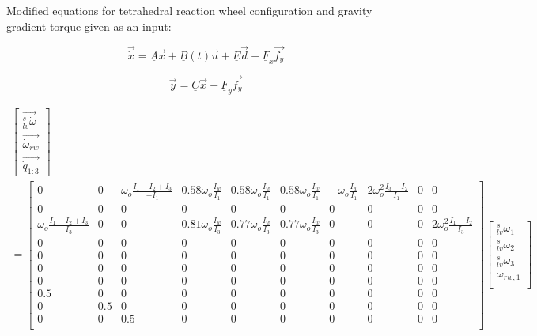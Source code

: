 \normalsize

Modified equations for tetrahedral reaction wheel configuration and gravity gradient torque given as an input:

\begin{equation}
\vec{\dot{x}} =
\underline{A}\vec{x} + \underline{B}(t)\vec{u} + \underline{E} \vec{d} + \underline{F}_x \vec{f_y} 
\label{eq:uioagain}
\end{equation}

\begin{equation}
\vec{y} =
\underline{C}\vec{x} + \underline{F}_y \vec{f_y} 
\label{eq:uioagain2}
\end{equation}

\tiny
\begin{align}
\begin{bmatrix}
\vec{_{lv}^s\dot{\omega}} \\
\vec{\dot{\omega}_{rw} } \\
\vec{\dot{q}_{1:3}}
\end{bmatrix} 
\nonumber\\
= \begin{bmatrix}
0 & 0 & \omega_o\frac{I_1 - I_2 + I_3}{-I_1} & 0.58\omega_o\frac{I_w}{I_1} & 0.58\omega_o\frac{I_w}{I_1} & 0.58\omega_o\frac{I_w}{I_1} & -\omega_o\frac{I_w}{I_1} & 2\omega_o^2\frac{I_3 - I_2}{I_1} & 0 & 0 \\
0 & 0 &	0 & 0 & 0 &	0 & 0 &  0 &  0 & 0\\
\omega_o\frac{I_1 - I_2 + I_3}{I_3}  & 0 & 0 &  0.81\omega_o\frac{I_w}{I_3} & 0.77\omega_o\frac{I_w}{I_3} & 0.77\omega_o\frac{I_w}{I_3} &	0 & 0 & 0 & 2\omega_o^2\frac{I_1 - I_2}{I_3}\\
0 & 0 &	0  & 0 & 0 & 0 & 0 & 0 & 0& 0\\
0 & 0 &	0  & 0 & 0 & 0 & 0 & 0 & 0& 0 \\
0 & 0 &	0 & 0 & 0 & 0 & 0 & 0 & 0& 0\\
0 & 0 &	0 & 0 & 0 & 0 & 0 & 0 & 0& 0\\
0.5 & 0 &	0 & 0 & 0 & 0 & 0 & 0 & 0& 0 \\
0 & 0.5 &	0& 0 & 0 & 0 & 0 & 0 & 0& 0 \\
0 & 0 &	0.5 & 0 & 0 & 0 & 0 & 0 & 0& 0\\
\end{bmatrix}
\begin{bmatrix}
_{lv}^s\omega_1 \\
_{lv}^s\omega_2 \\
_{lv}^s\omega_3 \\
\omega_{rw,1} \\

\end{bmatrix}
\end{align}
